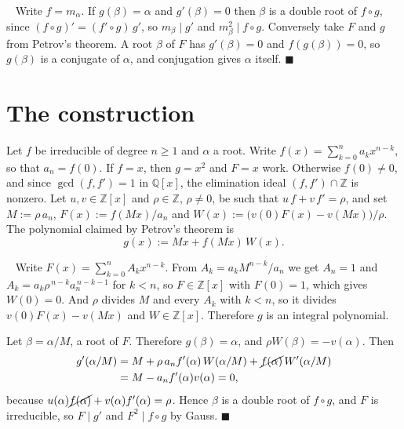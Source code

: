 \documentclass[10pt]{article}
\newcommand\Z{\mathbb{Z}}
\newcommand\Q{\mathbb{Q}}
\theoremstyle{plain}
\theoremstyle{remark}
\theoremstyle{plain}
\newenvironment{pf}{%
  \par\addvspace{\medskipamount}\noindent\uwave{pf.}\ \ignorespaces}{%
  \unskip\nobreak\hfill$\blacksquare$\par\addvspace{\medskipamount}}
\begin{document}
\begin{pf}
  Write $f = m_{\alpha}$. If $g(\beta) = \alpha$ and $g'(\beta) = 0$ then
  $\beta$ is a double root of $f \circ g$, since $(f \circ g)' = (f' \circ g)\,g'$,
  so $m_{\beta} \mid g'$ and $m_{\beta}^{2} \mid f \circ g$. Conversely take $F$
  and $g$ from Petrov's theorem. A root $\beta$ of $F$ has $g'(\beta) = 0$ and
  $f(g(\beta)) = 0$, so $g(\beta)$ is a conjugate of $\alpha$, and conjugation
  gives $\alpha$ itself.
\end{pf}

\section{The construction}\label{Scons}

Let $f$ be irreducible of degree $n \geq 1$ and $\alpha$ a root. Write
$f(x) = \sum_{k=0}^{n} a_{k}x^{n-k}$, so that $a_{n} = f(0)$. If $f = x$, then
$g = x^{2}$ and $F = x$ work. Otherwise $f(0) \neq 0$, and since
$\gcd(f,f') = 1$ in $\Q[x]$, the elimination ideal $(f,f') \cap \Z$ is nonzero.
Let $u, v \in \Z[x]$ and $\rho \in \Z$, $\rho \neq 0$, be such that
$u\,f + v\,f' = \rho$, and set $M := \rho\,a_{n}$, $F(x) := f(Mx)/a_{n}$ and
$W(x) := \bigl(v(0)F(x) - v(Mx)\bigr)/\rho$. The polynomial claimed by
Petrov's theorem is
\begin{equation}\label{Eg}
  g(x) := Mx + f(Mx)\,W(x).
\end{equation}

\begin{pf}
  Write $F(x) = \sum_{k=0}^{n} A_{k}x^{n-k}$. From $A_{k} = a_{k}M^{n-k}/a_{n}$
  we get $A_{n} = 1$ and
  $A_{k} = a_{k}\rho^{\,n-k}a_{n}^{\,n-k-1}$ for $k < n$, so $F \in \Z[x]$ with
  $F(0) = 1$, which gives $W(0) = 0$. And $\rho$ divides $M$ and every $A_{k}$
  with $k < n$, so it divides $v(0)F(x) - v(Mx)$ and $W \in \Z[x]$. Therefore
  $g$ is an integral polynomial.

  Let $\beta = \alpha/M$, a root of $F$. Therefore $g(\beta) = \alpha$, and
  $\rho W(\beta) = -v(\alpha)$. Then
  \begin{align*}
    g'(\alpha/M)
      &= M + \rho\,a_{n}f'(\alpha)\,W(\alpha/M)
         + \cancel{f(\alpha)}\,W'(\alpha/M) \\
      &= M - a_{n}f'(\alpha)v(\alpha) = 0 ,
  \end{align*}
  because $u(\alpha)\cancel{f(\alpha)} + v(\alpha)f'(\alpha) = \rho$.
  Hence $\beta$ is a double root of $f \circ g$, and $F$ is irreducible, so
  $F \mid g'$ and $F^{2} \mid f \circ g$ by Gauss.
\end{pf}
\end{document}
